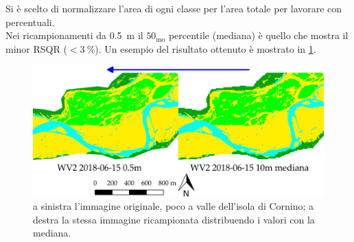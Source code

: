 %
Si è scelto di normalizzare l'area di ogni classe per l'area totale per lavorare con percentuali.
\\
Nei ricampionamenti da \SI{0.5}{\m} il $50_\mathrm{mo}$ percentile (mediana) è quello che mostra il minor RSQR ($<\SI{3}{\percent}$). Un esempio del risultato ottenuto è mostrato in \cref{fig:ricampionamento}.
%
\begin{figure}
	\centering
	\includegraphics[width=\textwidth]{files/ricamp_class_is_fl.jpeg}
	\caption[confronto originale - ricampionamento]{a sinistra l'immagine \WV{} originale, poco a valle dell'isola di Cornino; a destra la stessa immagine ricampionata distribuendo i valori con la mediana.}
	\label{fig:ricampionamento}
\end{figure} 
%


